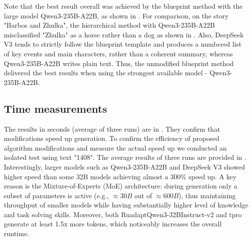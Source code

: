 \documentclass{superfri}
\begin{document}
Note that the best result overall was achieved by the blueprint method with the large model Qwen3-235B-A22B,
as shown in . For comparison, on the story "Barbos and Zhulka",
the hierarchical method with Qwen3-235B-A22B misclassified "Zhulka" as a horse rather than a dog as shown in . 
Also, DeepSeek V3 tends to strictly follow the blueprint template and produces a numbered list
of key events and main characters, rather than a coherent summary, whereas Qwen3-235B-A22B writes plain text.
Thus, the unmodified blueprint method delivered the best results when using the strongest available model - Qwen3-235B-A22B.

\subsection{Time measurements}

The results in seconds (average of three runs) are in .
They confirm that modifications speed up generation.
To confirm the efficiency of proposed algorithm modifications and measure the actual speed up we conducted an isolated test using text "1408". 
The average results of three runs are provided in . 
Interestingly, larger models such as Qwen3-235B-A22B and DeepSeek V3 showed higher speed
than some 32B models achieving almost a 300\% speed up.
A key reason is the Mixture-of-Experts (MoE) architecture:
during generation only a subset of parameters is active (e.g., $\approx30B$ out of $\approx600B$),
thus maintaining throughput of smaller models while having substantially higher level of knowledge and task solving skills.
Moreover, both RuadaptQwen3-32BInstruct-v2 and tpro generate at least 1.5x more tokens, which noticeably increases the overall runtime.

\end{document}
